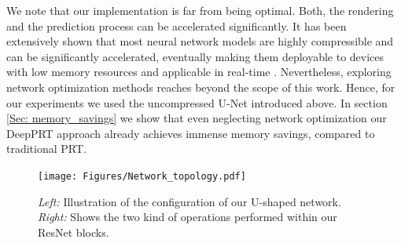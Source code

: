 We note that our implementation is far from being optimal.  Both, the rendering and the prediction process can be accelerated significantly. It has been extensively shown that most neural network models are highly compressible and can be significantly accelerated, eventually making them deployable to devices with low memory resources and applicable in real-time \cite{Deep_Compression, Survey_NN_Compression}.
Nevertheless, exploring network optimization methods reaches beyond the scope of this work. Hence, for our experiments we used the uncompressed U-Net introduced above. In section \ref{Sec: memory_savings} we show that even neglecting network optimization our DeepPRT approach already achieves immense memory savings, compared to traditional PRT. 
\begin{figure}[t]
  \centering
    \texttt{[image: Figures/Network\_topology.pdf]}
     \caption{\textit{Left:} Illustration of the configuration of our U-shaped network. \textit{Right:} Shows the two kind of operations performed within our ResNet blocks.}
     \label{Fig: NetworkTopology}
\end{figure}

  


